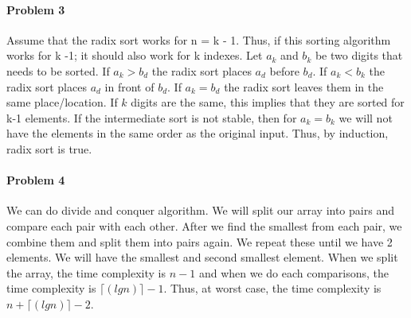 \documentclass[11pt]{article}
\begin{document}
\paragraph{\noindent\textbf{\LARGE{Problem 3}}}

\begin{flushleft}
    Assume that the radix sort works for n = k - 1. Thus, if this sorting algorithm works for k -1; it should also 
    work for k indexes. 
    \newline
    \newline
    Let $a_k$ and $b_k$ be two digits that needs to be sorted.
    \newline
    \newline
    If $a_k > b_d$ the radix sort places $a_d$ before $b_d$.
    If $a_k < b_k$ the radix sort places $a_d$ in front of $b_d$.
    If $a_k = b_d$ the radix sort leaves them in the same place/location.
    If $k$ digits are the same, this implies that they are sorted for k-1 elements. 
    If the intermediate sort is not stable, then for $a_k = b_k$ we will not have the elements in the same order as the original input.
    \newline
    \newline
    Thus, by induction, radix sort is true.
\end{flushleft}  


\paragraph{\noindent\textbf{\LARGE{Problem 4}}}

\begin{flushleft}
    We can do divide and conquer algorithm. We will split our array into pairs and compare each pair with each other. After we find the smallest from each pair, 
    we combine them and split them into pairs again. We repeat these until we have 2 elements.
    We will have the  smallest and second smallest element.
    \newline
    \newline
    When we split the array, the time complexity is $n-1$ and when we do each comparisons, the time complexity is ${\lceil}(lgn){\rceil} - 1$.
    Thus, at worst case, the time complexity is $n + {\lceil}(lgn){\rceil} - 2$.
\end{flushleft}
\end{document}
